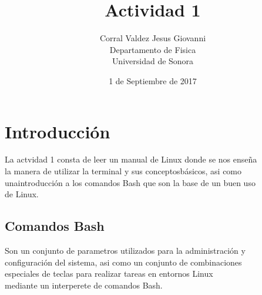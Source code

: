 \documentclass{article}
\title{Actividad 1}
\author{Corral Valdez Jesus Giovanni\\
Departamento de Fisica \\
Universidad de Sonora}
\date{1 de Septiembre de 2017}
\begin{document}
\maketitle
\clearpage

\section{Introducción}
La actvidad 1 consta de leer un manual de Linux donde se nos enseña\\
la manera de utilizar la terminal y sus conceptosbásicos, asi como  \\
unaintroducción a los comandos Bash que son la base de un buen uso \\
de Linux.
\subsection{Comandos Bash}
Son un conjunto de parametros utilizados para la administración y\\
configuración del sistema, asi como un conjunto de combinaciones \\
especiales de teclas para realizar tareas en entornos Linux      \\
mediante un interperete de comandos Bash.
\end{document}
